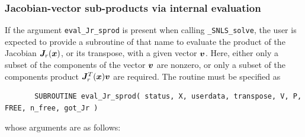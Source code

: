 \documentclass{galahad}
\newcommand{\packagename}{SNLS}
\newcommand{\fullpackagename}{\libraryname\_\packagename}
\newcommand{\solver}{{\tt \fullpackagename\_solve}}
\begin{document}

\subsubsection{Jacobian-vector sub-products via internal evaluation\label{sjvp}}

If the argument {\tt eval\_Jr\_sprod} is present when calling \solver, the
user is expected to provide a subroutine of that name to evaluate the
product of the Jacobian ${\bm{J}}_r({\bm{x}})$, or its transpose, with a given 
vector ${\bm{v}}$.
Here, either only a subset of the components of the vector ${\bm{v}}$ are nonzero,
or only a subset of the components product ${\bm{J}}_r^T({\bm{x}}) {\bm{v}}$ are required.
The routine must be specified as

\def\baselinestretch{0.8}
{\tt \begin{verbatim}
       SUBROUTINE eval_Jr_sprod( status, X, userdata, transpose, V, P, FREE, n_free, got_Jr )
\end{verbatim} }
\def\baselinestretch{1.0}
\noindent whose arguments are as follows:
\end{document}
